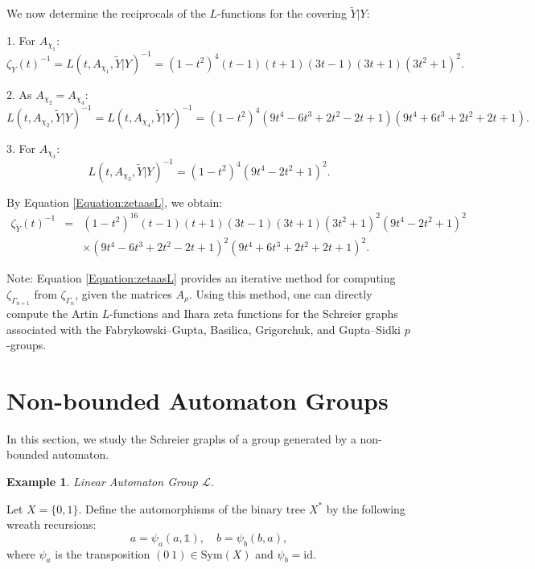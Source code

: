 \documentclass{article}
\newtheorem{myexa}{Example}[section]
\renewcommand{\L}{\mathcal{L}}
\newcommand{\G}{\Gamma}
\newcommand{\id}{\mathds{1}}
\newcommand{\idperm}{\mathrm{id}}
\newcommand{\Y}{\widetilde{Y}}
\begin{document}
We now determine the reciprocals of the $L$-functions for the covering $\Y|Y$:

1. For $A_{\chi_1}$:
$$
\zeta_{Y}(t)^{-1} = L(t, A_{\chi_1}, \Y|Y)^{-1} = (1 - t^2)^4 (t - 1)(t + 1)(3t - 1)(3t + 1)(3t^2 + 1)^2.
$$

2. As $A_{\chi_2} = A_{\chi_4}$:
$$
L(t, A_{\chi_2}, \Y|Y)^{-1} = L(t, A_{\chi_4}, \Y|Y)^{-1} = (1 - t^2)^4 (9t^4 - 6t^3 + 2t^2 - 2t + 1)(9t^4 + 6t^3 + 2t^2 + 2t + 1).
$$

3. For $A_{\chi_3}$:
$$
L(t, A_{\chi_3}, \Y|Y)^{-1} = (1 - t^2)^4 (9t^4 - 2t^2 + 1)^2.
$$

By Equation \eqref{Equation:zetaasL}, we obtain:
\begin{eqnarray}
\zeta_{\Y}(t)^{-1} &=& (1 - t^2)^{16} (t - 1)(t + 1)(3t - 1)(3t + 1)(3t^2 + 1)^2 (9t^4 - 2t^2 + 1)^2 \nonumber \\
&& \times (9t^4 - 6t^3 + 2t^2 - 2t + 1)^2 (9t^4 + 6t^3 + 2t^2 + 2t + 1)^2. \nonumber
\end{eqnarray}

Note: Equation \eqref{Equation:zetaasL} provides an iterative method for computing $\zeta_{\G_{n+1}}$ from $\zeta_{\G_n}$, given the matrices $A_{\rho}$. Using this method, one can directly compute the Artin $L$-functions and Ihara zeta functions for the Schreier graphs associated with the Fabrykowski–Gupta, Basilica, Grigorchuk, and Gupta–Sidki $p$-groups.

\section{Non-bounded Automaton Groups}\label{sec:nonbounded}

In this section, we study the Schreier graphs of a group generated by a non-bounded automaton.

\begin{myexa} \label{Example:lin-group-ex} Linear Automaton Group $\L$. \end{myexa}
Let $X = \{0,1\}$. Define the automorphisms of the binary tree $X^*$ by the following wreath recursions:
\begin{equation}
\label{Equation:wr-lin-group}
a = \psi_a(a, \id),\quad b = \psi_b (b, a),
\end{equation}
where $\psi_a$ is the transposition $(0~1) \in \mathrm{Sym}(X)$ and $\psi_b = \idperm$.
\end{document}
